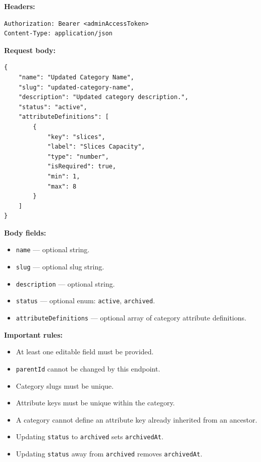 \textbf{Headers:}

\begin{verbatim}
Authorization: Bearer <adminAccessToken>
Content-Type: application/json
\end{verbatim}

\pagebreak
\textbf{Request body:}

\begin{verbatim}
{
    "name": "Updated Category Name",
    "slug": "updated-category-name",
    "description": "Updated category description.",
    "status": "active",
    "attributeDefinitions": [
        {
            "key": "slices",
            "label": "Slices Capacity",
            "type": "number",
            "isRequired": true,
            "min": 1,
            "max": 8
        }
    ]
}
\end{verbatim}

\textbf{Body fields:}

\begin{itemize}
    \item \texttt{name} --- optional string.
    \item \texttt{slug} --- optional slug string.
    \item \texttt{description} --- optional string.
    \item \texttt{status} --- optional enum: \texttt{active}, \texttt{archived}.
    \item \texttt{attributeDefinitions} --- optional array of category attribute definitions.
\end{itemize}

\textbf{Important rules:}

\begin{itemize}
    \item At least one editable field must be provided.
    \item \texttt{parentId} cannot be changed by this endpoint.
    \item Category slugs must be unique.
    \item Attribute keys must be unique within the category.
    \item A category cannot define an attribute key already inherited from an ancestor.
    \item Updating \texttt{status} to \texttt{archived} sets \texttt{archivedAt}.
    \item Updating \texttt{status} away from \texttt{archived} removes \texttt{archivedAt}.
\end{itemize}

